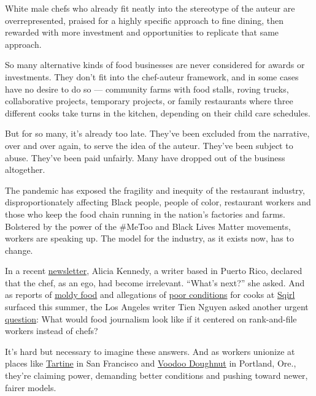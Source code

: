 White male chefs who already fit neatly into the stereotype of the
auteur are overrepresented, praised for a highly specific approach to
fine dining, then rewarded with more investment and opportunities to
replicate that same approach.

So many alternative kinds of food businesses are never considered for
awards or investments. They don't fit into the chef-auteur framework,
and in some cases have no desire to do so --- community farms with food
stalls, roving trucks, collaborative projects, temporary projects, or
family restaurants where three different cooks take turns in the
kitchen, depending on their child care schedules.

But for so many, it's already too late. They've been excluded from the
narrative, over and over again, to serve the idea of the auteur. They've
been subject to abuse. They've been paid unfairly. Many have dropped out
of the business altogether.

The pandemic has exposed the fragility and inequity of the restaurant
industry, disproportionately affecting Black people, people of color,
restaurant workers and those who keep the food chain running in the
nation's factories and farms. Bolstered by the power of the \#MeToo and
Black Lives Matter movements, workers are speaking up. The model for the
industry, as it exists now, has to change.

In a recent
\href{https://aliciakennedy.substack.com/p/on-restaurants}{newsletter},
Alicia Kennedy, a writer based in Puerto Rico, declared that the chef,
as an ego, had become irrelevant. ``What's next?'' she asked. And as
reports of
\href{https://www.washingtonpost.com/news/voraciously/wp/2020/07/13/after-la-cafe-sqirl-sold-moldy-jam-its-owner-cited-a-mycologist-to-defend-it-but-he-doesnt-approve/}{moldy
food} and allegations of
\href{https://thelandmag.com/beyond-moldy-jam-the-inside-story-of-what-went-wrong-at-sqirl/}{poor
conditions} for cooks at \href{https://sqirlla.com/}{Sqirl} surfaced
this summer, the Los Angeles writer Tien Nguyen asked another urgent
\href{https://tien.substack.com/p/what-would-a-food-media-that-de-centers}{question}:
What would food journalism look like if it centered on rank-and-file
workers instead of chefs?

It's hard but necessary to imagine these answers. And as workers
unionize at places like \href{https://twitter.com/TartineUnion}{Tartine}
in San Francisco and
\href{https://nwlaborpress.org/wp-content/uploads/2020/03/VoodooDoughnutsUnionAnnouncement.pdf}{Voodoo
Doughnut} in Portland, Ore., they're claiming power, demanding better
conditions and pushing toward newer, fairer models.

